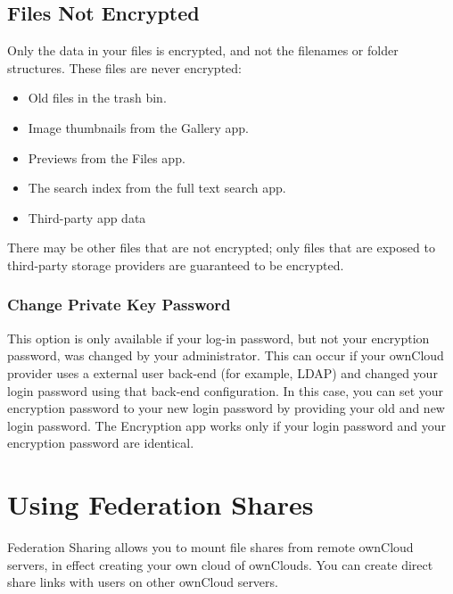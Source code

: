 \documentclass[letterpaper,10pt,english]{sphinxmanual}
\begin{document}
\subsection{Files Not Encrypted}
\label{files/encrypting_files:files-not-encrypted}
Only the data in your files is encrypted, and not the filenames or folder
structures. These files are never encrypted:
\begin{itemize}
\item {} 
Old files in the trash bin.

\item {} 
Image thumbnails from the Gallery app.

\item {} 
Previews from the Files app.

\item {} 
The search index from the full text search app.

\item {} 
Third-party app data

\end{itemize}

There may be other files that are not encrypted; only files that are exposed to
third-party storage providers are guaranteed to be encrypted.


\subsubsection{Change Private Key Password}
\label{files/encrypting_files:change-private-key-password}
This option is only available if your log-in password, but not your encryption
password, was changed by your administrator. This can occur if your ownCloud
provider uses a external user back-end (for example, LDAP) and changed your
login password using that back-end configuration. In this case, you can set
your encryption password to your new login password by providing your old and
new login password. The Encryption app works only if your login password and
your encryption password are identical.


\section{Using Federation Shares}
\label{files/federated_cloud_sharing:using-federation-shares}\label{files/federated_cloud_sharing::doc}
Federation Sharing allows you to mount file shares from remote ownCloud servers, in effect
creating your own cloud of ownClouds. You can create direct share links with
users on other ownCloud servers.
\end{document}
